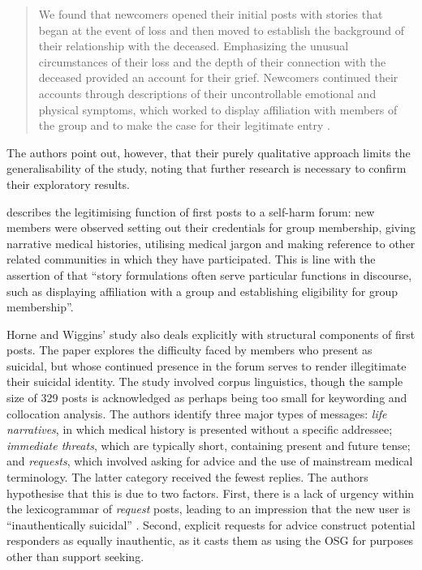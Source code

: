 		 \begin{quote}\small\singlespacing
		  We found that newcomers opened their initial posts with stories that began at the event of loss and then moved to establish the background of their relationship with the deceased. Emphasizing the unusual circumstances of their loss and the depth of their connection with the deceased provided an account for their grief. Newcomers continued their accounts through descriptions of their uncontrollable emotional and physical symptoms, which worked to display affiliation with members of the group and to make the case for their legitimate entry \citeyear[p.~5]{varga_grieving_2013}. 
		 \end{quote}

		 \noindent The authors point out, however, that their purely qualitative approach limits the generalisability of the study, noting that further research is necessary to confirm their exploratory results.

		 \textcite{smithson_membership_2011} describes the legitimising function of first posts to a self-harm forum: new members were observed setting out their credentials for group membership, giving narrative medical histories, utilising medical jargon and making reference to other related communities in which they have participated. This is line with the assertion of \textcite{varga_grieving_2013} that ``story formulations often serve particular functions in discourse, such as displaying affiliation with a group and establishing eligibility for group membership''.

		 Horne and Wiggins' \citeyear[p.~173]{horne_doing_2009} study also deals explicitly with structural components of first posts. The paper explores the difficulty faced by members who present as suicidal, but whose continued presence in the forum serves to render illegitimate their suicidal identity. The study involved corpus linguistics, though the sample size of 329 posts is acknowledged as perhaps being too small for keywording and collocation analysis. The authors identify three major types of messages: \emph{life narratives}, in which medical history is presented without a specific addressee; \emph{immediate threats}, which are typically short, containing present and future tense; and \emph{requests}, which involved asking for advice and the use of mainstream medical terminology. The latter category received the fewest replies. The authors hypothesise that this is due to two factors. First, there is a lack of urgency within the lexicogrammar of \emph{request} posts, leading to an impression that the new user is ``inauthentically suicidal'' \citeyear[p.~180]{horne_doing_2009} . Second, explicit requests for advice construct potential responders as equally inauthentic, as it casts them as using the OSG for purposes other than support seeking.


